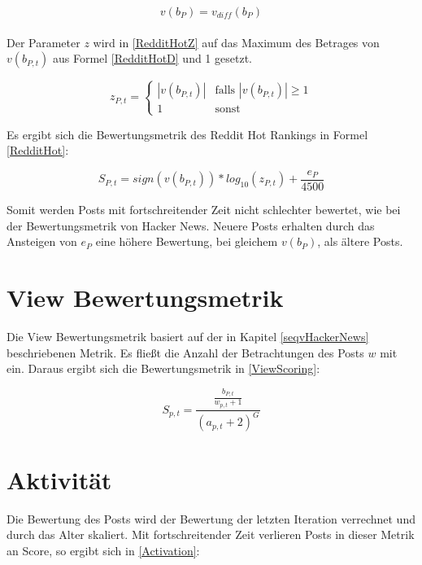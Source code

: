\begin{equation}
\label{RedditHotD}
v(b_{P}) = v_{diff}(b_{P})
\end{equation}
\\
Der Parameter $z$ wird in \ref{RedditHotZ} auf das Maximum des Betrages von $v(b_{P,t})$ aus Formel \ref{RedditHotD} und 1 gesetzt.

\begin{equation}
\label{RedditHotZ}
z_{P,t}  = \begin{cases}
|v(b_{P,t})| &\text{falls $|v(b_{P,t})| \geq 1$}\\
1 &\text{sonst}
\end{cases}
\end{equation}

Es ergibt sich die Bewertungsmetrik des Reddit Hot Rankings in Formel \ref{RedditHot}:

\begin{equation}
\label{RedditHot}
S_{P,t} = sign(v(b_{P,t})) * log_{10}(z_{P,t}) + \frac{e_{P}}{4500}
\end{equation}

Somit werden Posts mit fortschreitender Zeit nicht schlechter bewertet, wie bei der Bewertungsmetrik von Hacker News. Neuere Posts erhalten durch das Ansteigen von $e_P$ eine höhere Bewertung, bei gleichem $v(b_P)$, als ältere Posts. 
 

\section{View Bewertungsmetrik}

Die View Bewertungsmetrik basiert auf der in Kapitel \ref{seqvHackerNews} beschriebenen Metrik. Es fließt die Anzahl der Betrachtungen des Posts $w$ mit ein. Daraus ergibt sich die Bewertungsmetrik in \ref{ViewScoring}:

\begin{equation}
\label{ViewScoring}
S_{p,t} = \frac{\frac{b_{P,t}}{w_{p,t} + 1}}{(a_{p,t} + 2)^{G}}
\end{equation}

\section{Aktivität}

Die Bewertung des Posts wird der Bewertung der letzten Iteration verrechnet und durch das Alter skaliert. Mit fortschreitender Zeit verlieren Posts in dieser Metrik an Score, so ergibt sich in \ref{Activation}:

